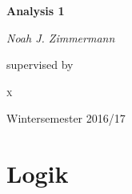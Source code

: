 \documentclass[headsepline,12pt,a4paper]{scrartcl}
\begin{document}
\begin{titlepage}
	\centering
	{\huge\bfseries Analysis 1\par}
	\vspace{2cm}
	{\Large\itshape Noah J. Zimmermann\par}
	\vfill
	supervised by\par
	 \textsc{x}

	\vfill

	{\large Wintersemester 2016/17\par}
\end{titlepage}

\tableofcontents

\newpage

\section*{Logik}
\end{document}

